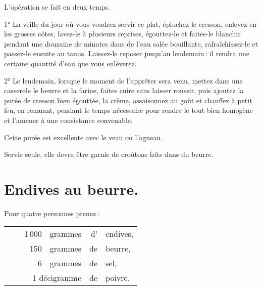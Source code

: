L'opération se fait en deux temps.

\medskip

1° La veille du jour où vous voudrez servir ce plat, épluchez le cresson,
enlevez-en les grosses côtes, lavez-le à plusieurs reprises, égouttez-le et
faites-le blanchir pendant une douzaine de minutes dans de l'eau salée
bouillante, rafraîchissez-le et passez-le ensuite au tamis. Laissez-le reposer
jusqu'au lendemain : il rendra une certaine quantité d'eau que vous enlèverez.

2° Le lendemain, lorsque le moment de l’apprêter sera venu, mettez dans une
casserole le beurre et la farine, faites cuire sans laisser roussir, puis
ajoutez la purée de cresson bien égouttée, la crème, assaisonnez au goût et
chauffez à petit feu, en remuant, pendant le temps nécessaire pour rendre le
tout bien homogène et l'amener à une consistance convenable.

\medskip

Cette purée est excellente avec le veau ou l'agneau.

\medskip

Servie seule, elle devra être garnie de croûtons frits dans du beurre.

\section*{\centering Endives au beurre.}
{}

Pour quatre personnes prenez :

\footnotesize
\begin{longtable}{rrrrrp{18em}}
  & \hspace{2em}  & 1 000 & grammes & d' & endives,                                                       \\
  & \hspace{2em}  &   150 & grammes & de & beurre,                                                        \\
  & \hspace{2em}  &     6 & grammes & de & sel,                                                           \\
  & \multicolumn{3}{r}{1 décigramme}  & de & poivre.                                                      \\
\end{longtable}
\normalsize

